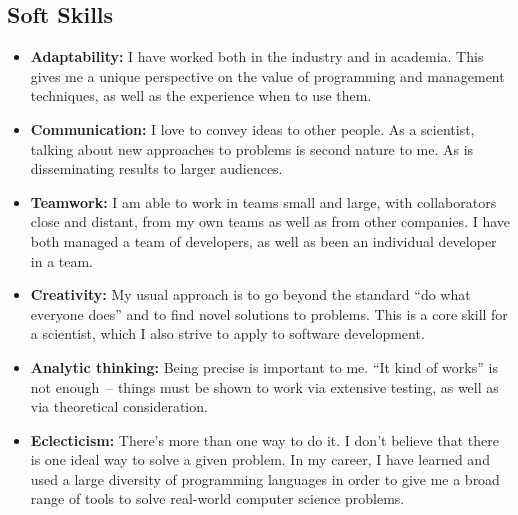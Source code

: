 \documentclass[line,mm]{res}
\newcounter{x}
\newcounter{y}
\newcounter{z}
\begin{document}
\begin{resume}
\section{Soft Skills}
\begin{itemize}
\item \textbf{Adaptability:}
  I have worked both in the industry and in academia.  This gives me a unique
  perspective on the value of programming and management techniques, as well as
  the experience when to use them. 
\item \textbf{Communication:}
  I love to convey ideas to other people.  As a scientist, talking about new
  approaches to problems is second nature to me.  As is disseminating results to
  larger audiences. 
\item \textbf{Teamwork:}
  I am able to work in teams small and large, with collaborators close and
  distant, from my own teams as well as from other companies.  I have both
  managed a team of developers, as well as been an individual developer in a team.
\item \textbf{Creativity:}
  My usual approach is to go beyond the standard ``do what everyone does'' and
  to find novel solutions to problems.  This is a core skill for a scientist,
  which I also strive to apply to software development. 
\item \textbf{Analytic thinking:}
  Being precise is important to me.  ``It kind of works'' is not enough~--
  things must be shown to work via extensive testing, as well as via theoretical
  consideration. 
\item \textbf{Eclecticism:}
  There's more than one way to do it.  I don't believe that there is one ideal
  way to solve a given problem.  In my career, I have learned and used a large
  diversity of programming languages in order to give me a broad range of tools
  to solve real-world computer science problems.
\end{itemize}
\fi


\end{resume}
\end{document}
